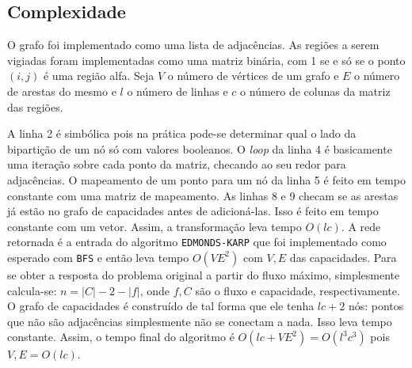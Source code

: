 \documentclass[7pt]{article}
\newcommand{\tit}[1]{\textit{#1}}
\newcommand{\ttt}[1]{\texttt{#1}}
\begin{document}
\begin{multicols}{2}

\section{Complexidade}
O grafo foi implementado como uma lista de adjacências.
As regiões a serem vigiadas foram implementadas como uma matriz binária, com
1 se e só se o ponto $(i, j)$ é uma região alfa.
Seja $V$ o número de vértices de um grafo e $E$ o número de arestas do mesmo e
$l$ o número de linhas e $c$ o número de colunas da matriz das regiões.

A linha 2 é simbólica pois na prática pode-se determinar qual o lado
da bipartição de um nó só com valores booleanos.
O \tit{loop} da linha 4 é basicamente uma iteração sobre cada ponto da matriz,
checando ao seu redor para adjacências. O mapeamento de um ponto para um nó
da linha 5 é feito em tempo constante com uma matriz de mapeamento.
As linhas 8 e 9 checam se as arestas já estão no grafo de capacidades
antes de adicioná-las. Isso é feito em tempo constante com um vetor.
Assim, a transformação leva tempo $O(lc)$.
A rede retornada é a entrada do algoritmo \ttt{EDMONDS-KARP} que foi
implementado como esperado com \ttt{BFS} e então leva tempo $O(VE^2)$
com $V, E$ das capacidades.
Para se obter a resposta do problema original a partir do fluxo máximo,
simplesmente calcula-se: $n = |C| - 2 - |f|$, onde $f, C$ são o fluxo e
capacidade, respectivamente. O grafo de capacidades é construído de tal
forma que ele tenha $lc + 2$ nós: pontos que não são adjacências simplesmente
não se conectam a nada. Isso leva tempo constante.
Assim, o tempo final do algoritmo é $O(lc + VE^2) = O(l^3c^3)$ pois
$V, E = O(lc)$.

\printbibliography

\end{multicols}
\end{document}
